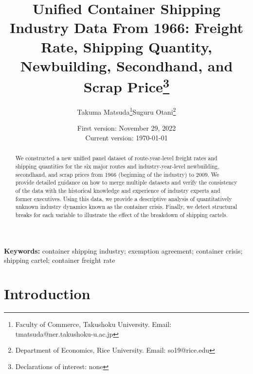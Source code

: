 \documentclass[11pt]{article}
\title{Unified Container Shipping Industry Data From 1966: Freight Rate, Shipping Quantity, Newbuilding, Secondhand, and Scrap Price\thanks{ Declarations of interest: none}}
\author{Takuma Matsuda\thanks{Faculty of Commerce, Takushoku University. Email: tmatsuda@ner.takushoku-u.ac.jp}\quad  Suguru Otani\thanks{Department of Economics, Rice University. Email: so19@rice.edu}}
\date{
First version: November 29, 2022\\
Current version: \today
}
\begin{document}
\maketitle

\begin{abstract}
We constructed a new unified panel dataset of route-year-level freight rates and shipping quantities for the six major routes and industry-year-level newbuilding, secondhand, and scrap prices from 1966 (beginning of the industry) to 2009. We provide detailed guidance on how to merge multiple datasets and verify the consistency of the data with the historical knowledge and experience of industry experts and former executives. Using this data, we provide a descriptive analysis of quantitatively unknown industry dynamics known as the container crisis. Finally, we detect structural breaks for each variable to illustrate the effect of the breakdown of shipping cartels.
\end{abstract} 

\vspace{0.1in}
\noindent\textbf{Keywords:} container shipping industry; exemption agreement; container crisis; shipping cartel; container freight rate 
\vspace{0in}


{
\flushright{}}

\section{Introduction}\label{sec:introduction}
\end{document}
